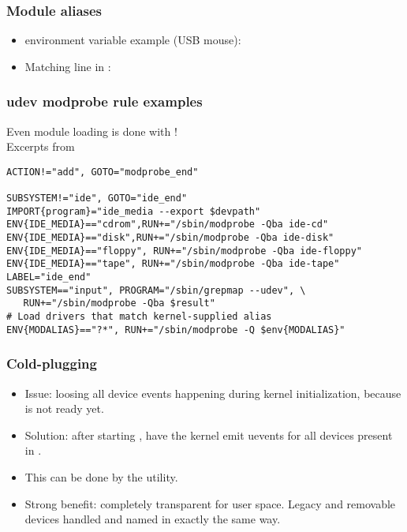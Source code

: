 \begin{frame}
  \frametitle{Module aliases}
  \begin{itemize}
  \item {} environment variable example (USB mouse):\\
  \item Matching line in :\\
  \end{itemize}
\end{frame}

\begin{frame}[fragile]
  \frametitle{udev modprobe rule examples}
  Even module loading is done with !\\
  Excerpts from 
  \begin{block}{}
\footnotesize
\begin{verbatim}
ACTION!="add", GOTO="modprobe_end"

SUBSYSTEM!="ide", GOTO="ide_end"
IMPORT{program}="ide_media --export $devpath"
ENV{IDE_MEDIA}=="cdrom",RUN+="/sbin/modprobe -Qba ide-cd"
ENV{IDE_MEDIA}=="disk",RUN+="/sbin/modprobe -Qba ide-disk"
ENV{IDE_MEDIA}=="floppy", RUN+="/sbin/modprobe -Qba ide-floppy"
ENV{IDE_MEDIA}=="tape", RUN+="/sbin/modprobe -Qba ide-tape"
LABEL="ide_end"
SUBSYSTEM=="input", PROGRAM="/sbin/grepmap --udev", \
   RUN+="/sbin/modprobe -Qba $result"
# Load drivers that match kernel-supplied alias
ENV{MODALIAS}=="?*", RUN+="/sbin/modprobe -Q $env{MODALIAS}"
\end{verbatim}
  \end{block}
\end{frame}

\begin{frame}
  \frametitle{Cold-plugging}
  \begin{itemize}
  \item Issue: loosing all device events happening during kernel
    initialization, because \code{udev} is not ready yet.
  \item Solution: after starting , have the kernel emit
    uevents for all devices present in \code{/sys}.
  \item This can be done by the  utility.
  \item Strong benefit: completely transparent for user space. Legacy
    and removable devices handled and named in exactly the same way.
  \end{itemize}
\end{frame}

